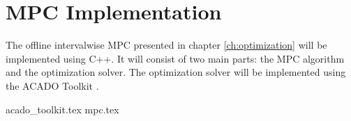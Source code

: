 \chapter{MPC Implementation}

The offline intervalwise MPC presented in chapter \ref{ch:optimization} will be implemented using C++. It will consist of two main parts: the MPC algorithm and the optimization solver. The optimization solver will be implemented using the ACADO Toolkit \cite{acadoHOUSKA}.



{acado_toolkit.tex}
{mpc.tex}